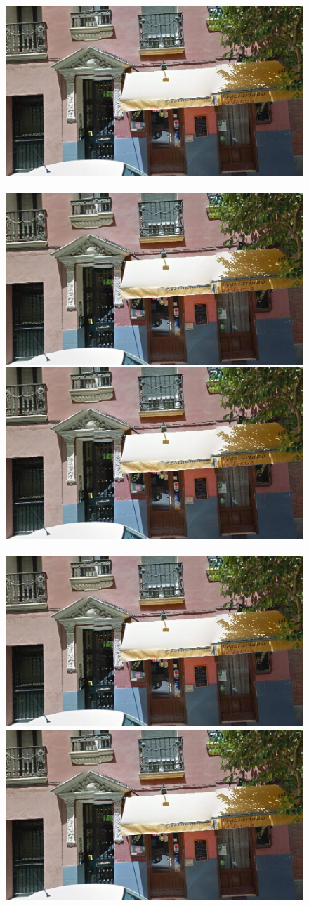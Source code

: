 \documentclass[runningheads, table]{llncs}
\begin{document}
\begin{figure}
\begin{minipage}{\linewidth}
\begin{minipage}{0.3\linewidth}
      \includegraphics[width=0.49\linewidth]{imgs/cutout_pitch04.jpg}
      \\ \vspace{-3mm} \\
      \includegraphics[width=0.49\linewidth]{imgs/cutout_pitch04.jpg}
      \includegraphics[width=0.49\linewidth]{imgs/cutout_pitch04.jpg}
      \\ \vspace{-3mm} \\
      \includegraphics[width=0.49\linewidth]{imgs/cutout_pitch04.jpg}
      \includegraphics[width=0.49\linewidth]{imgs/cutout_pitch04.jpg}

\end{minipage}
\end{minipage}
\end{figure}
\end{document}
